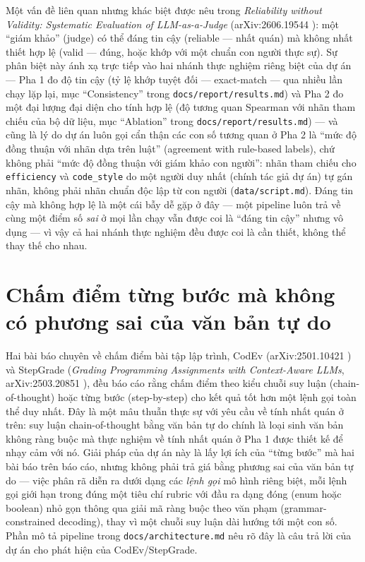 \documentclass[a4paper,12pt]{report}
\begin{document}
Một vấn đề liên quan nhưng khác biệt được nêu trong \textit{Reliability
without Validity: Systematic Evaluation of LLM-as-a-Judge}
(arXiv:2606.19544 \cite{reliability_without_validity}): một ``giám khảo''
(judge) có thể đáng tin cậy (reliable — nhất quán) mà không nhất thiết hợp
lệ (valid — đúng, hoặc khớp với một chuẩn con người thực sự). Sự phân biệt
này ánh xạ trực tiếp vào hai nhánh thực nghiệm riêng biệt của dự án — Pha
1 đo độ tin cậy (tỷ lệ khớp tuyệt đối — exact-match — qua nhiều lần chạy
lặp lại, mục ``Consistency'' trong \texttt{docs/report/results.md}) và Pha
2 đo một đại lượng đại diện cho tính hợp lệ (độ tương quan Spearman với
nhãn tham chiếu của bộ dữ liệu, mục ``Ablation'' trong
\texttt{docs/report/results.md}) — và cũng là lý do dự án luôn gọi cẩn
thận các con số tương quan ở Pha 2 là ``mức độ đồng thuận với nhãn dựa trên
luật'' (agreement with rule-based labels), chứ không phải ``mức độ đồng
thuận với giám khảo con người'': nhãn tham chiếu cho \texttt{efficiency}
và \texttt{code\_style} do một người duy nhất (chính tác giả dự án) tự gán
nhãn, không phải nhãn chuẩn độc lập từ con người
(\texttt{data/script.md}). Đáng tin cậy mà không hợp lệ là một cái bẫy dễ
gặp ở đây — một pipeline luôn trả về cùng một điểm số \emph{sai} ở mọi lần
chạy vẫn được coi là ``đáng tin cậy'' nhưng vô dụng — vì vậy cả hai nhánh
thực nghiệm đều được coi là cần thiết, không thể thay thế cho nhau.

\section{Chấm điểm từng bước mà không có phương sai của văn bản tự do}

Hai bài báo chuyên về chấm điểm bài tập lập trình, CodEv (arXiv:2501.10421
\cite{codev}) và StepGrade (\textit{Grading Programming Assignments with
Context-Aware LLMs}, arXiv:2503.20851 \cite{stepgrade}), đều báo cáo rằng
chấm điểm theo kiểu chuỗi suy luận (chain-of-thought) hoặc từng bước
(step-by-step) cho kết quả tốt hơn một lệnh gọi toàn thể duy nhất. Đây là
một mâu thuẫn thực sự với yêu cầu về tính nhất quán ở trên: suy luận
chain-of-thought bằng văn bản tự do chính là loại sinh văn bản không ràng
buộc mà thực nghiệm về tính nhất quán ở Pha 1 được thiết kế để nhạy cảm với
nó. Giải pháp của dự án này là lấy lợi ích của ``từng bước'' mà hai bài
báo trên báo cáo, nhưng không phải trả giá bằng phương sai của văn bản tự
do — việc phân rã diễn ra dưới dạng các \emph{lệnh gọi} mô hình riêng biệt,
mỗi lệnh gọi giới hạn trong đúng một tiêu chí rubric với đầu ra dạng đóng
(enum hoặc boolean) nhỏ gọn thông qua giải mã ràng buộc theo văn phạm
(grammar-constrained decoding), thay vì một chuỗi suy luận dài hướng tới
một con số. Phần mô tả pipeline trong \texttt{docs/architecture.md} nêu rõ
đây là câu trả lời của dự án cho phát hiện của CodEv/StepGrade.
\end{document}
